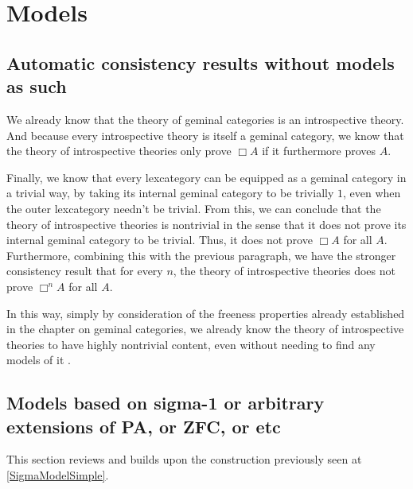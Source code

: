 \section{Models}

\subsection{Automatic consistency results without models as such}
We already know that the theory of geminal categories is an introspective theory. And because every introspective theory is itself a geminal category, we know that the theory of introspective theories only prove $\Box A$ if it furthermore proves $A$.

Finally, we know that every lexcategory can be equipped as a geminal category in a trivial way, by taking its internal geminal category to be trivially $1$, even when the outer lexcategory needn't be trivial. From this, we can conclude that the theory of introspective theories is nontrivial in the sense that it does not prove its internal geminal category to be trivial. Thus, it does not prove $\Box A$ for all $A$. Furthermore, combining this with the previous paragraph, we have the stronger consistency result that for every $n$, the theory of introspective theories does not prove $\Box^n A$ for all $A$.

In this way, simply by consideration of the freeness properties already established in the chapter on geminal categories, we already know the theory of introspective theories to have highly nontrivial content, even without needing to find any models of it .


\subsection{Models based on sigma-1 or arbitrary extensions of PA, or ZFC, or etc}

This section reviews and builds upon the construction previously seen at \cref{SigmaModelSimple}.

